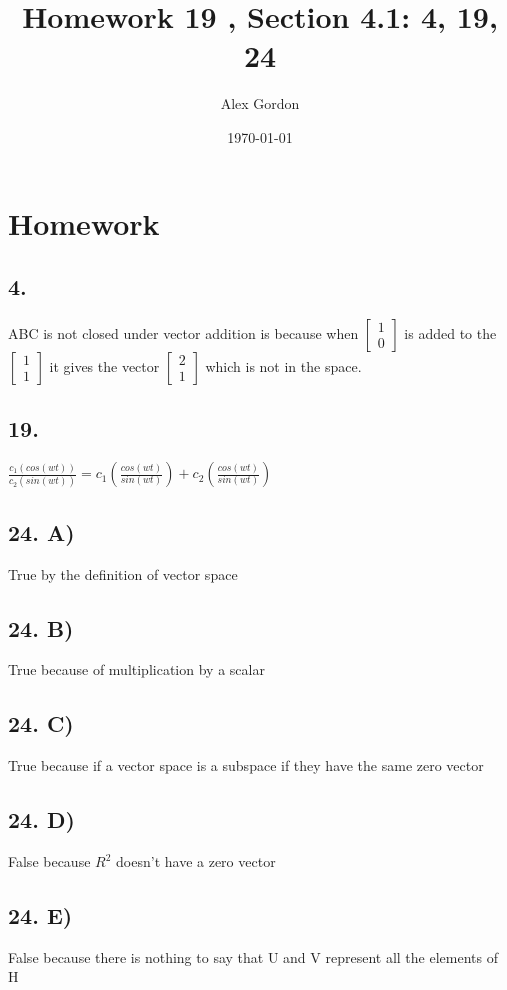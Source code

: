 \documentclass[12]{scrartcl}
\begin{document}
\title{Homework 19 , Section 4.1: 4, 19, 24}
\author{Alex Gordon}
\date{\today}
\maketitle
\section*{Homework}
\subsection*{4.}
ABC is not closed under vector addition is because when $ \begin{bmatrix}  1 \\  0   \end{bmatrix}$ is added to the $ \begin{bmatrix}  1 \\  1  \end{bmatrix}$ it gives the vector $ \begin{bmatrix}  2 \\  1   \end{bmatrix}$ which is not in the space. 
\subsection*{19.}
$\frac{c_1(cos(wt))}{c_2(sin(wt))} = c_1(\frac{cos(wt)}{sin(wt)}) + c_2(\frac{cos(wt)}{sin(wt)})$
\subsection*{24. A)}
True by the definition of vector space
\subsection*{24. B)}
True because of multiplication by a scalar
\subsection*{24. C)}
True because if a vector space is a subspace if they have the same zero vector
\subsection*{24. D)}
False because $R^2$ doesn't have a zero vector
\subsection*{24. E)}
False because there is nothing to say that U and V represent all the elements of H 
\end{document}
